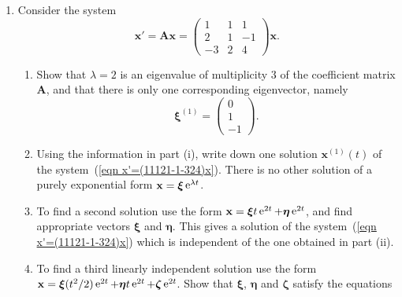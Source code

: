 {\begin{Exercise}
\end{Exercise}









\begin{Exercise}
  \label{exercise 3x3 triple eigenvalue}
  \begin{enumerate}
  \item
    Consider the system
    \begin{equation}
      \label{eqn x'=(11121-1-324)x}
      \mathbf{x}' = \mathbf{A} \mathbf{x} 
      = \begin{pmatrix}
        1 & 1 & 1\\
        2 & 1 & -1\\
        -3 & 2 & 4
      \end{pmatrix} \mathbf{x} .
    \end{equation}
    \begin{enumerate}
    \item
      Show that $\lambda = 2$ is an eigenvalue of multiplicity $3$ of the
      coefficient matrix $\mathbf{A}$, and that there is only one corresponding
      eigenvector, namely
      \[
      \boldsymbol{\xi}^{(1)} = \begin{pmatrix}
        0 \\
        1\\
        -1
      \end{pmatrix}.
      \]
    \item
      Using the information in part (i), write down one solution
      $\mathbf{x}^{(1)}(t)$ of the system~(\ref{eqn x'=(11121-1-324)x}). 
      There is no other solution of a purely exponential form $\mathbf{x} = \boldsymbol{\xi} \mathop{\mathrm{e}}\nolimits^{\lambda t}$.
    \item
      To find a second solution use the form $\mathbf{x} = \boldsymbol{\xi} t \mathop{\mathrm{e}}\nolimits^{2t} + \boldsymbol{\eta} \mathop{\mathrm{e}}\nolimits^{2 t}$, 
      and find appropriate vectors $\boldsymbol{\xi}$ and $\boldsymbol{\eta}$. This gives
      a solution of the system~(\ref{eqn x'=(11121-1-324)x}) which is independent 
      of the one obtained in part (ii).
    \item
      To find a third linearly independent solution use the form
      $\mathbf{x} = \boldsymbol{\xi} (t^2/2) \mathop{\mathrm{e}}\nolimits^{2 t} + \boldsymbol{\eta} t \mathop{\mathrm{e}}\nolimits^{2 t} + \boldsymbol{\zeta} \mathop{\mathrm{e}}\nolimits^{2 t}$.
      Show that $\boldsymbol{\xi}$, $\boldsymbol{\eta}$ and $\boldsymbol{\zeta}$ satisfy the equations

\end{enumerate}
\end{enumerate}
\end{Exercise}}
